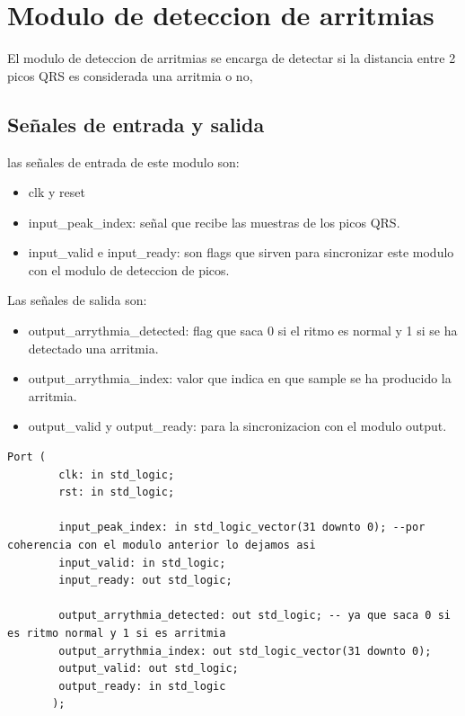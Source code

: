 \section{Modulo de deteccion de arritmias}

El modulo de deteccion de arritmias se encarga de detectar si la distancia entre 2 picos QRS es considerada una arritmia o no,
 
\subsection{Señales de entrada y salida}
las señales de entrada de este modulo son:

\begin{itemize}
    \item clk y reset
    \item input\_peak\_index: señal que recibe las muestras de los picos QRS.
    \item input\_valid e input\_ready: son flags que sirven para sincronizar este modulo con el modulo de deteccion de picos. 
\end{itemize}
    
Las señales de salida son:

\begin{itemize}
    \item output\_arrythmia\_detected: flag que saca 0 si el ritmo es normal y 1 si se ha detectado una arritmia.
    \item output\_arrythmia\_index: valor que indica en que sample se ha producido la arritmia.
    \item output\_valid y output\_ready: para la sincronizacion con el modulo output.
\end{itemize}

\lstset{language=VHDL, breaklines=true, basicstyle=\footnotesize}
\begin{lstlisting}[frame=single]
    Port (
        clk: in std_logic;
        rst: in std_logic;
        
        input_peak_index: in std_logic_vector(31 downto 0); --por coherencia con el modulo anterior lo dejamos asi
        input_valid: in std_logic;
        input_ready: out std_logic;
        
        output_arrythmia_detected: out std_logic; -- ya que saca 0 si es ritmo normal y 1 si es arritmia
        output_arrythmia_index: out std_logic_vector(31 downto 0);
        output_valid: out std_logic;
        output_ready: in std_logic
       );
\end{lstlisting}

